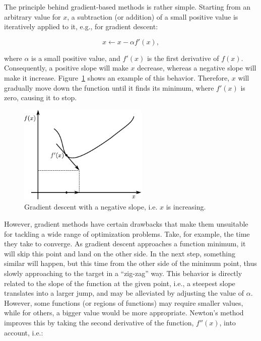 The principle behind gradient-based methods is rather simple. Starting
from an arbitrary value for $x$, a subtraction (or addition) of a
small positive value is iteratively applied to it, e.g., for gradient
descent:

\begin{equation}
x\leftarrow x-\alpha f'(x),
\end{equation}


\noindent where $\alpha$ is a small positive value, and $f'(x)$
is the first derivative of $f(x)$. Consequently, a positive slope
will make $x$ decrease, whereas a negative slope will make it increase.
Figure~\ref{fig:02-gradient_descent} shows an example of this behavior.
Therefore, $x$ will gradually move down the function until it finds
its minimum, where $f'(x)$ is zero, causing it to stop.

\begin{figure}
\centering

\includegraphics[width=0.55\textwidth]{02-background_and_motivation/img/gradient_descent}

\caption{Gradient descent with a negative slope, i.e. $x$ is increasing. \label{fig:02-gradient_descent}}
\end{figure}


However, gradient methods have certain drawbacks that make them unsuitable
for tackling a wide range of optimization problems. Take, for example,
the time they take to converge. As gradient descent approaches a function
minimum, it will skip this point and land on the other side. In the
next step, something similar will happen, but this time from the other
side of the minimum point, thus slowly approaching to the target in
a ``zig-zag'' way. This behavior is directly related to the slope
of the function at the given point, i.e., a steepest slope translates
into a larger jump, and may be alleviated by adjusting the value of
$\alpha$. However, some functions (or regions of functions) may require
smaller values, while for others, a bigger value would be more appropriate.
Newton's method improves this by taking the second derivative of the
function, $f''(x)$, into account, i.e.:

